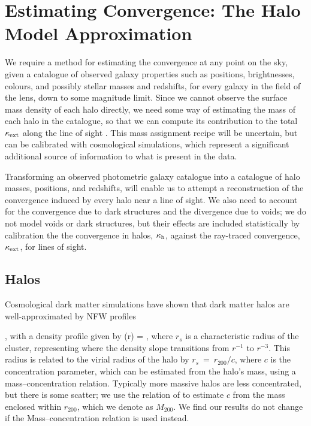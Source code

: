 \documentclass[useAMS,usenatbib,a4paper]{mn2e}
\begin{document}

\section{Estimating Convergence: The Halo Model Approximation}
\label{sec:model}

We require a method for estimating the
convergence at any point on the sky, given a catalogue of observed
galaxy properties such as positions, brightnesses, colours, and
possibly stellar masses and redshifts, for every galaxy in the field of
the lens, down to some magnitude limit. Since we cannot observe the
surface mass density of each halo directly, we need some way of
estimating the mass of each halo in the catalogue, so that we can compute
its contribution to the total $\kappa_{\rm ext}$ along the line of sight \citep[as
in \eg][]{GunnarssonEtal2006,WongEtal2011,KarpenkaEtal2012}. 
This mass assignment recipe
will be uncertain, but can be calibrated with cosmological simulations, which
represent a significant additional source of information to what is present in
the data.

Transforming an observed photometric galaxy catalogue into a 
catalogue of halo masses, positions, and redshifts, will enable us to
attempt a reconstruction of the convergence induced by every halo near a
line of sight. {We also need to account for the convergence due to dark structures and
the divergence due to voids; we do not model voids or dark structures, but their
effects are included statistically by calibration the the convergence in halos,
$\kappa_{\rm h}$, against the ray-traced convergence, $\kappa_{\rm ext}$, for \MS lines of sight.}



\subsection{Halos}
\label{sec:model:halos}

Cosmological dark matter simulations have shown that dark matter
halos are well-approximated by NFW profiles 


\citep{NFW}, with a density
profile given by
\be\label{eq:rhonfw}
\rho(r) = 
,
\ee
where $r_{s}$ is a characteristic radius of the cluster, representing where
the density slope transitions from $r^{-1}$ to $r^{-3}$. This radius is related
to the virial radius of the halo by $r_{s}~=~r_{200}/c$, where $c$ is the concentration parameter, which can be estimated from the halo's mass,
using a mass--concentration relation. Typically more massive halos are less concentrated,
but there is some scatter; we use the relation of \citet{Neto2007} to estimate $c$
from the mass enclosed within $r_{200}$, which we denote as $M_{200}$. We find our results do not change if the \citet{MaccioEtal2008} Mass--concentration relation is used instead. 
\end{document}
